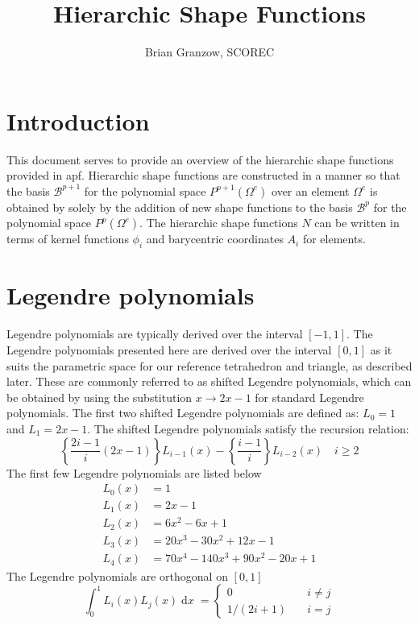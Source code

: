 \documentclass{article}
\title{Hierarchic Shape Functions}
\author{Brian Granzow, SCOREC}
\begin{document}
\maketitle

\section{Introduction}

This document serves to provide an overview of the hierarchic shape functions
provided in apf. Hierarchic shape functions are constructed in a manner so that
the basis $\mathcal{B}^{p+1}$ for the polynomial space $P^{p+1}(\Omega^e)$
over an element $\Omega^e$ is obtained by solely by the addition of new shape
functions to the basis $\mathcal{B}^p$ for the polynomial space
$P^p(\Omega^e)$. The hierarchic shape functions $N$ can be written in terms
of kernel functions $\phi_i$ and barycentric coordinates $A_i$ for elements.

\section{Legendre polynomials}

Legendre polynomials are typically derived over the interval $[-1,1]$. The
Legendre polynomials presented here are derived over the interval $[0,1]$
as it suits the parametric space for our reference tetrahedron and triangle,
as described later. These are commonly referred to as shifted Legendre
polynomials, which can be obtained by using the substitution $x \to 2x - 1$ for
standard Legendre polynomials. The first two shifted Legendre polynomials are
defined as: $L_0 = 1$ and $L_1 = 2x - 1$. The shifted Legendre polynomials
satisfy the recursion relation:
\[
\left\{ \frac{2i-1}{i} (2x-1)\right \} L_{i-1}(x) -
\left\{ \frac{i-1}{i} \right \} L_{i-2}(x) \quad i \geq 2
\]
The first few Legendre polynomials are listed below
\begin{align*}
L_0(x) &= 1 \\
L_1(x) &= 2x - 1 \\
L_2(x) &= 6x^2 - 6x + 1 \\
L_3(x) &= 20x^3 - 30x^2 + 12x - 1 \\
L_4(x) & = 70x^4 - 140x^3 + 90x^2 - 20x + 1
\end{align*}
The Legendre polynomials are orthogonal on $[0,1]$
\[
\int _0 ^1 L_i(x) L_j(x) \; \text{d}x \; =
\begin{cases}
0 &\quad i \neq j \\
1/(2i+1) &\quad i = j
\end{cases}
\]
\end{document}
